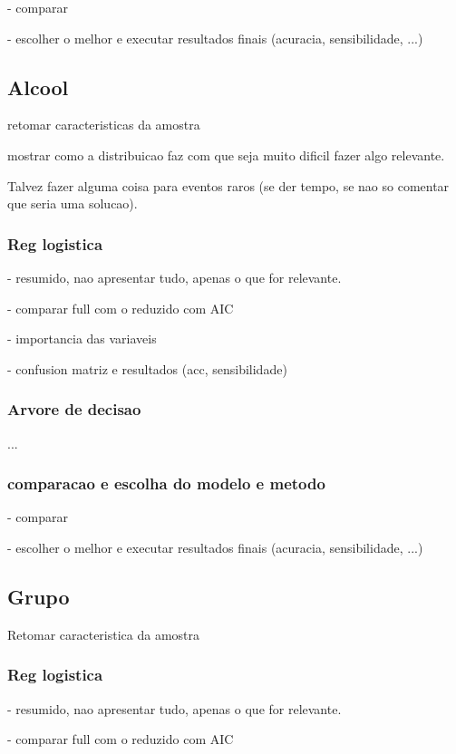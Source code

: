 \documentclass[
	article,			%
	11pt,				%
	oneside,			%
	a4paper,			%
	english,			%
	brazil,				%
	sumario=tradicional
	]{abntex2}
\begin{document}
- comparar

- escolher o melhor e executar resultados finais (acuracia, sensibilidade, ...)

\subsection{Alcool}

retomar caracteristicas da amostra

mostrar como a distribuicao faz com que seja muito dificil fazer algo relevante.

Talvez fazer alguma coisa para eventos raros (se der tempo, se nao so comentar que seria uma solucao).

\subsubsection{Reg logistica}

- resumido, nao apresentar tudo, apenas o que for relevante.

- comparar full com o reduzido com AIC

- importancia das variaveis

- confusion matriz e resultados (acc, sensibilidade)
\subsubsection{Arvore de decisao}
... 

\subsubsection{comparacao e escolha do modelo e metodo}

- comparar

- escolher o melhor e executar resultados finais (acuracia, sensibilidade, ...)

\subsection{Grupo}

Retomar caracteristica da amostra

\subsubsection{Reg logistica}

- resumido, nao apresentar tudo, apenas o que for relevante.

- comparar full com o reduzido com AIC
\end{document}
